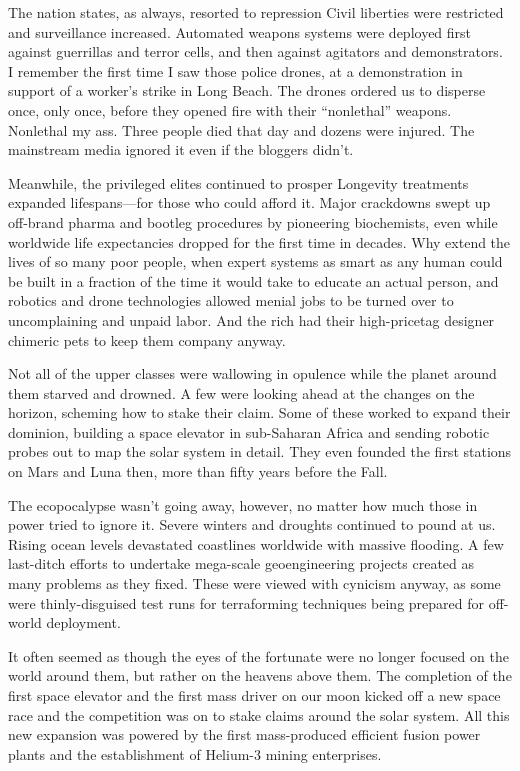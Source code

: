The nation states, as always, resorted to repression
Civil liberties were restricted and surveillance
increased. Automated weapons systems were deployed
first against guerrillas and terror cells, and
then against agitators and demonstrators. I remember
the first time I saw those police drones, at a
demonstration in support of a worker's strike in Long 
Beach. The drones ordered us to disperse once, only 
once, before they opened fire with their ``nonlethal'' 
weapons. Nonlethal my ass. Three people died that 
day and dozens were injured. The mainstream media 
ignored it even if the bloggers didn't.

Meanwhile, the privileged elites continued to prosper
Longevity treatments expanded lifespans—for
those who could afford it. Major crackdowns swept 
up off-brand pharma and bootleg procedures by 
pioneering biochemists, even while worldwide life expectancies
dropped for the first time in decades. Why
extend the lives of so many poor people, when expert 
systems as smart as any human could be built in a 
fraction of the time it would take to educate an actual 
person, and robotics and drone technologies allowed 
menial jobs to be turned over to uncomplaining and 
unpaid labor. And the rich had their high-pricetag 
designer chimeric pets to keep them company anyway.

Not all of the upper classes were wallowing in 
opulence while the planet around them starved and 
drowned. A few were looking ahead at the changes on 
the horizon, scheming how to stake their claim. Some 
of these worked to expand their dominion, building 
a space elevator in sub-Saharan Africa and sending 
robotic probes out to map the solar system in detail. 
They even founded the first stations on Mars and 
Luna then, more than fifty years before the Fall.

The ecopocalypse wasn't going away, however, no 
matter how much those in power tried to ignore it. 
Severe winters and droughts continued to pound at us. 
Rising ocean levels devastated coastlines worldwide 
with massive flooding. A few last-ditch efforts to undertake
mega-scale geoengineering projects created as
many problems as they fixed. These were viewed with 
cynicism anyway, as some were thinly-disguised test 
runs for terraforming techniques being prepared for 
off-world deployment.

It often seemed as though the eyes of the fortunate 
were no longer focused on the world around them, 
but rather on the heavens above them. The completion
of the first space elevator and the first mass driver
on our moon kicked off a new space race and the 
competition was on to stake claims around the solar 
system. All this new expansion was powered by the 
first mass-produced efficient fusion power plants and 
the establishment of Helium-3 mining enterprises.

